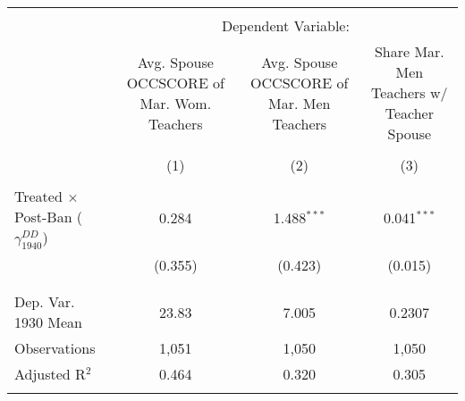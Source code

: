 
\begin{tabular}{@{\extracolsep{5pt}}lccc} 
\\[-1.8ex]\hline 
\hline \\[-1.8ex] 
 & \multicolumn{3}{c}{Dependent Variable:} \\ 
\cline{2-4} 
 & Avg. Spouse OCCSCORE of Mar. Wom. Teachers & Avg. Spouse OCCSCORE of Mar. Men Teachers & Share Mar. Men Teachers w/ Teacher Spouse \\ 
\\[-1.8ex] & (1) & (2) & (3)\\ 
\hline \\[-1.8ex] 
 Treated $\times$ Post-Ban ($\gamma_{1940}^{DD}$) & 0.284 & 1.488$^{***}$ & 0.041$^{***}$ \\ 
  & (0.355) & (0.423) & (0.015) \\ 
  & & & \\ 
\hline \\[-1.8ex] 
Dep. Var. 1930 Mean & 23.83 & 7.005 & 0.2307 \\ 
Observations & 1,051 & 1,050 & 1,050 \\ 
Adjusted R$^{2}$ & 0.464 & 0.320 & 0.305 \\ 
\hline 
\hline \\[-1.8ex] 
\end{tabular} 
